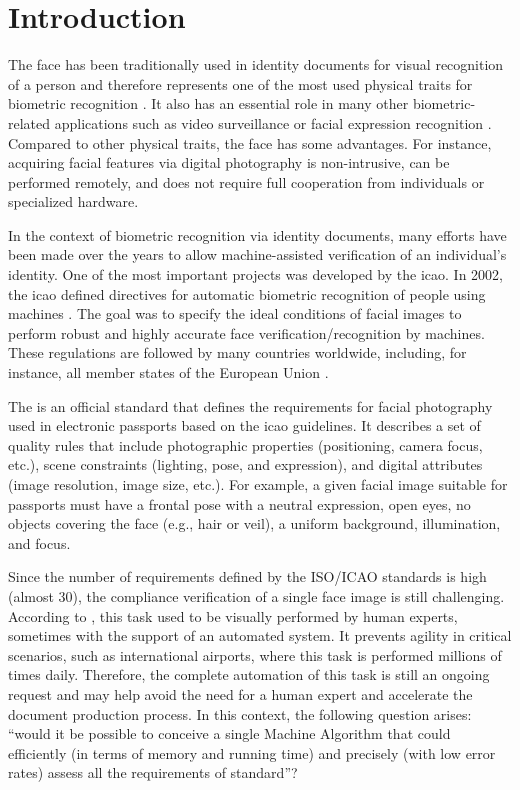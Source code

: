 \section{Introduction}
 
The face has been traditionally used in identity documents for visual recognition of a person and therefore represents one of the most used physical traits for biometric recognition \citep{ferrara2012face}. It also has an essential role in many other biometric-related applications such as video surveillance \citep{de2015partially} or facial expression recognition \citep{anil2016literature}. Compared to other physical traits, the face has some advantages. For instance, acquiring facial features via digital photography is non-intrusive, can be performed remotely, and does not require full cooperation from individuals or specialized hardware.
 
In the context of biometric recognition via identity documents, many efforts have been made over the years to allow machine-assisted verification of an individual's identity. One of the most important projects was developed by the \acf{icao}. In 2002, the \acs{icao} defined directives for automatic biometric recognition of people using machines \citep{icao2003report}. The goal was to specify the ideal conditions of facial images to perform robust and highly accurate face verification/recognition by machines. These regulations are followed by many countries worldwide, including, for instance, all member states of the European Union \citep{ebinger2008international}.
 
The \icao \citep{iso-iec} is an official standard that defines the requirements for facial photography used in electronic passports based on the \acs{icao} guidelines. It describes a set of quality rules that include photographic properties (positioning, camera focus, etc.), scene constraints (lighting, pose, and expression), and digital attributes (image resolution, image size, etc.). For example, a given facial image suitable for passports must have a frontal pose with a neutral expression, open eyes, no objects covering the face (e.g., hair or veil), a uniform background, illumination, and focus.
 
Since the number of requirements defined by the ISO/ICAO standards is high (almost 30), the compliance verification of a single face image is still challenging. According to \cite{ferrara2012multi}, this task used to be visually performed by human experts, sometimes with the support of an automated system. It prevents agility in critical scenarios, such as international airports, where this task is performed millions of times daily. Therefore, the complete automation of this task is still an ongoing request and may help avoid the need for a human expert and accelerate the document production process. In this context, the following question arises: ``would it be possible to conceive a single Machine Algorithm that could efficiently (in terms of memory and running time) and precisely (with low error rates) assess all the requirements of \icao standard''?
 
